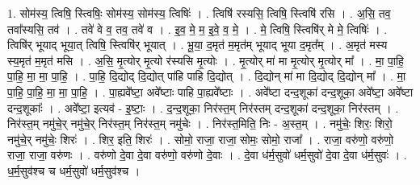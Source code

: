 \documentclass[17pt]{extarticle}
\begin{document}
1. सोम॑स्य॒ त्विषि॒ स्त्विषिः॒ सोम॑स्य॒ सोम॑स्य॒ त्विषिः॑ । . त्विषि॑ रस्यसि॒ त्विषि॒ स्त्विषि॑ रसि । . अ॒सि॒ तव॒ तवा᳚स्यसि॒ तव॑ । . तवे॑ वे व॒ तव॒ तवे॑ व । . इ॒व॒ मे॒ म॒ इ॒वे॒ व॒ मे॒ । . मे॒ त्विषि॒ स्त्विषि॑र् मे मे॒ त्विषिः॑ । . त्विषि॑र् भूयाद् भूया॒त् त्विषि॒ स्त्विषि॑र् भूयात् । . भू॒या॒ द॒मृत॑ म॒मृत॑म् भूयाद् भूया द॒मृत᳚म् । . अ॒मृत॑ मस्य स्य॒मृत॑ म॒मृत॑ मसि । . अ॒सि॒ मृ॒त्योर् मृ॒त्यो र॑स्यसि मृ॒त्योः । . मृ॒त्योर् मा॑ मा मृ॒त्योर् मृ॒त्योर् मा᳚ । . मा॒ पा॒हि॒ पा॒हि॒ मा॒ मा॒ पा॒हि॒ । . पा॒हि॒ दि॒द्योद् दि॒द्योत् पा॑हि पाहि दि॒द्योत् । . दि॒द्योन् मा॑ मा दि॒द्योद् दि॒द्योन् मा᳚ । . मा॒ पा॒हि॒ पा॒हि॒ मा॒ मा॒ पा॒हि॒ । . पा॒ह्यवे᳚ष्टा॒ अवे᳚ष्टाः पाहि पा॒ह्यवे᳚ष्टाः । . अवे᳚ष्टा दन्द॒शूका॑ दन्द॒शूका॒ अवे᳚ष्टा॒ अवे᳚ष्टा दन्द॒शूकाः᳚ । . अवे᳚ष्टा॒ इत्यव॑ - इ॒ष्टाः॒ । . द॒न्द॒शूका॒ निर॑स्त॒म् निर॑स्तम् दन्द॒शूका॑ दन्द॒शूका॒ निर॑स्तम् । . निर॑स्त॒म् नमु॑चे॒र् नमु॑चे॒र् निर॑स्त॒म् निर॑स्त॒म् नमु॑चेः । . निर॑स्त॒मिति॒ निः - अ॒स्त॒म् । . नमु॑चेः॒ शिरः॒ शिरो॒ नमु॑चे॒र् नमु॑चेः॒ शिरः॑ । . शिर॒ इति॒ शिरः॑ । . सोमो॒ राजा॒ राजा॒ सोमः॒ सोमो॒ राजा᳚ । . राजा॒ वरु॑णो॒ वरु॑णो॒ राजा॒ राजा॒ वरु॑णः । . वरु॑णो दे॒वा दे॒वा वरु॑णो॒ वरु॑णो दे॒वाः । . दे॒वा ध॑र्म॒सुवो॑ धर्म॒सुवो॑ दे॒वा दे॒वा ध॑र्म॒सुवः॑ । . ध॒र्म॒सुव॑श्च च धर्म॒सुवो॑ धर्म॒सुव॑श्च । \newline
\end{document}
